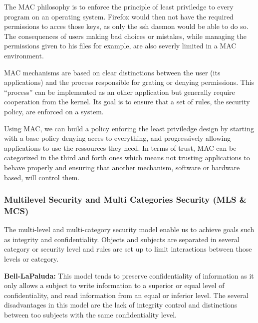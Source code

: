 \documentclass[pdftex,a4paper,titlepage,11pt]{article}
\begin{document}
\bigskip

The MAC philosophy is to enforce the principle of least priviledge to every program on an operating system. Firefox would then not have the required permissions to acces those keys, as only the ssh daemon would be able to do so. The consequences of users making bad choices or mistakes, while managing the permissions given to his files for example, are also severly limited in a MAC environment.

\bigskip

MAC mechanisms are based on clear distinctions between the user (its applications) and the process responsible for grating or denying permissions. This ``process'' can be implemented as an other application but generally require cooperation from the kernel. Its goal is to ensure that a set of rules, the security policy, are enforced on a system.

\bigskip

Using MAC, we can build a policy enforing the least priviledge design by starting with a base policy denying acces to everything, and progressively allowing applications to use the ressources they need. In terms of trust, MAC can be categorized in the third and forth ones which means not trusting applications to behave properly and ensuring that another mechanism, software or hardware based, will control them.

\subsubsection{Multilevel Security and Multi Categories Security (MLS \& MCS)}

The multi-level and multi-category security model enable us to achieve goals such as integrity and confidentiality. Objects and subjects are separated in several category or security level and rules are set up to limit interactions between those levels or category.

\bigskip

\textbf{Bell-LaPaluda:} This model tends to preserve confidentiality of information as it only allows a subject to write information to a superior or equal level of confidentiality, and read information from an equal or inferior level. The several disadvantages in this model are the lack of integrity control and distinctions between too subjects with the same confidentiality level.
\end{document}
